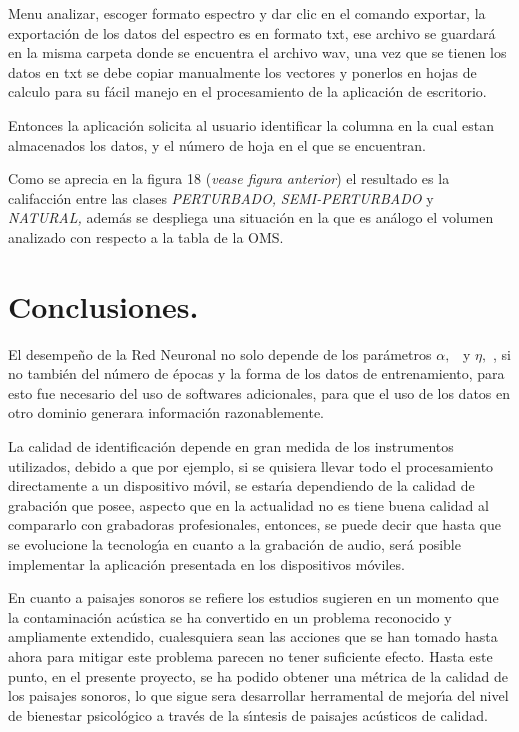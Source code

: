 Menu analizar, escoger formato espectro y dar clic en el comando exportar, la
exportaci\'{o}n de los datos del espectro es en formato txt, ese archivo se
guardar\'{a} en la misma carpeta donde se encuentra el archivo wav, una vez
que se tienen los datos en txt se debe copiar manualmente los vectores y
ponerlos en hojas de calculo para su f\'{a}cil manejo en el procesamiento de
la aplicaci\'{o}n de escritorio.

Entonces la aplicaci\'{o}n solicita al usuario identificar la columna en la
cual estan almacenados los datos, y el n\'{u}mero de hoja en el que se encuentran.

Como se aprecia en la figura 18 (\textit{vease figura anterior}) el resultado
es la califacci\'{o}n entre las clases \textit{PERTURBADO,}
\textit{SEMI-PERTURBADO} y \textit{NATURAL, }adem\'{a}s se despliega una
situaci\'{o}n en la que es an\'{a}logo el volumen analizado con respecto a la
tabla de la OMS.

\section*{Conclusiones.}

El desempe\~{n}o de la Red Neuronal no solo depende de los par\'{a}metros
$\alpha,$ \ y $\eta,$ , si no tambi\'{e}n del n\'{u}mero de \'{e}pocas y la
forma de los datos de entrenamiento, para esto fue necesario del uso de
softwares adicionales, para que el uso de los datos en otro dominio generara
informaci\'{o}n razonablemente.

La calidad de identificaci\'{o}n depende en gran medida de los instrumentos
utilizados, debido a que por ejemplo, si se quisiera llevar todo el
procesamiento directamente a un dispositivo m\'{o}vil, se estar\'{\i}a
dependiendo de la calidad de grabaci\'{o}n que posee, aspecto que en la
actualidad no es tiene buena calidad al compararlo con grabadoras
profesionales, entonces, se puede decir que hasta que se evolucione la
tecnolog\'{\i}a en cuanto a la grabaci\'{o}n de audio, ser\'{a} posible
implementar la aplicaci\'{o}n presentada en los dispositivos m\'{o}viles.

En cuanto a paisajes sonoros se refiere los estudios sugieren en un momento
que la contaminaci\'{o}n ac\'{u}stica se ha convertido en un problema
reconocido y ampliamente extendido, cualesquiera sean las acciones que se han
tomado hasta ahora para mitigar este problema parecen no tener suficiente
efecto. Hasta este punto, en el presente proyecto, se ha podido obtener una
m\'{e}trica de la calidad de los paisajes sonoros, lo que sigue sera
desarrollar herramental de mejor\'{\i}a del nivel de bienestar psicol\'{o}gico
a trav\'{e}s de la s\'{\i}ntesis de paisajes ac\'{u}sticos de calidad.

